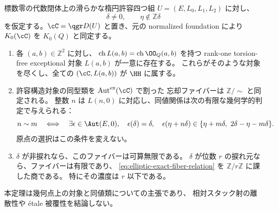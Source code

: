 \begin{theorem}[楕円型の全標識と忘却ファイバー]
\label{thm:elliptic-marking-lattice-fiber}
標数零の代数閉体上の滑らかな楕円許容四つ組
$U=(E,L_0,L_1,L_2)$ に対し、
\begin{equation}\label{eq:elliptic-nonresonance}
 \delta\ne0,\qquad \eta\notin\mathbb Z\delta
\end{equation}
を仮定する。$\cC=\qgr D(U)$ と置き、元の normalized foundation により
$K_0(\cC)$ を $K_0(Q)$ と同定する。
\begin{enumerate}
\item 各 $(a,b)\in\mathbb Z^2$ に対し、
$\operatorname{ch}L(a,b)=\operatorname{ch}\OO_Q(a,b)$ を持つ
rank-one torsion-free exceptional 対象 $L(a,b)$ が一意に存在する。
これらがそのような対象を尽くし、全ての $(\cC,L(a,b))$ が $\HH$ に属する。
\item 許容構造対象の同型類を $\operatorname{Aut}^{\mathrm{ex}}(\cC)$ で割った
忘却ファイバーは $\mathbb Z/{\sim}$ と同定される。
整数 $n$ は $L(n,0)$ に対応し、同値関係は次の有限な幾何学的判定で与えられる：
\begin{equation}\label{eq:elliptic-exact-fiber-relation}
 n\sim m
 \quad\Longleftrightarrow\quad
 \exists\epsilon\in\Aut(E,0),\quad
 \epsilon(\delta)=\delta,\quad
 \epsilon(\eta+n\delta)\in
 \{\eta+m\delta,\ 2\delta-\eta-m\delta\}.
\end{equation}
原点の選択はこの条件を変えない。
\item $\delta$ が非捩れなら、このファイバーは可算無限である。
$\delta$ が位数 $r$ の捩れ元なら、ファイバーは有限であり、
\eqref{eq:elliptic-exact-fiber-relation} を $\mathbb Z/r\mathbb Z$ に課した商である。
特にその濃度は $r$ 以下である。
\end{enumerate}
本定理は幾何点上の対象と同値類についての主張であり、
相対スタック射の離散性や étale 被覆性を結論しない。
\end{theorem}
